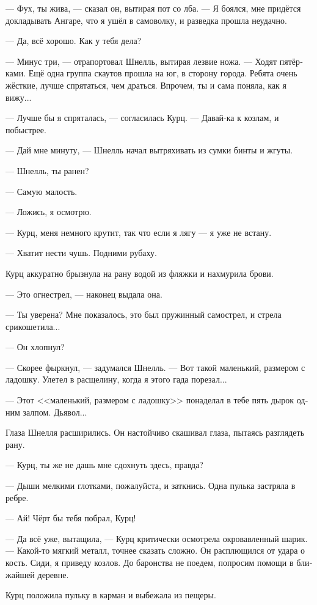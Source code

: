 \documentclass[a4paper,10pt,fleqn]{book}\usepackage{polyglossia}\setdefaultlanguage[babelshorthands=true]{russian}\setotherlanguage{english}\defaultfontfeatures{Ligatures=TeX,Mapping=tex-text}\usepackage{xcolor}\newcommand{\ml}[3]{#2}
\begin{document}
--- Фух, ты жива, --- сказал он, вытирая пот со лба.
--- Я боялся, мне придётся докладывать Ангаре, что я ушёл в самоволку, и разведка прошла неудачно.

--- Да, всё хорошо.
Как у тебя дела?

--- Минус три, --- отрапортовал Шнелль, вытирая лезвие ножа.
--- Ходят пятёрками.
Ещё одна группа скаутов прошла на юг, в сторону города.
Ребята очень жёсткие, лучше спрятаться, чем драться.
Впрочем, ты и сама поняла, как я вижу...

--- Лучше бы я спряталась, --- согласилась Курц.
--- Давай-ка к козлам, и побыстрее.

--- Дай мне минуту, --- Шнелль начал вытряхивать из сумки бинты и жгуты.

--- Шнелль, ты ранен?

--- Самую малость.

--- Ложись, я осмотрю.

--- Курц, меня немного крутит, так что если я лягу --- я уже не встану.

--- Хватит нести чушь.
Подними рубаху.

Курц аккуратно брызнула на рану водой из фляжки и нахмурила брови.

--- Это огнестрел, --- наконец выдала она.

--- Ты уверена?
Мне показалось, это был пружинный самострел, и стрела срикошетила...

--- Он хлопнул?

--- Скорее фыркнул, --- задумался Шнелль.
--- Вот такой маленький, размером с ладошку.
Улетел в расщелину, когда я этого гада порезал...

--- Этот <<маленький, размером с ладошку>> понаделал в тебе пять дырок одним залпом.
Дьявол...

Глаза Шнелля расширились.
Он настойчиво скашивал глаза, пытаясь разглядеть рану.

--- Курц, ты же не дашь мне сдохнуть здесь, правда?

--- Дыши мелкими глотками, пожалуйста, и заткнись.
Одна пулька застряла в ребре.

--- Ай!
Чёрт бы тебя побрал, Курц!

--- Да всё уже, вытащила, --- Курц критически осмотрела окровавленный шарик.
--- Какой-то мягкий металл, точнее сказать сложно.
Он расплющился от удара о кость.
Сиди, я приведу козлов.
До баронства не поедем, попросим помощи в ближайшей деревне.

Курц положила пульку в карман и выбежала из пещеры.
\end{document}
